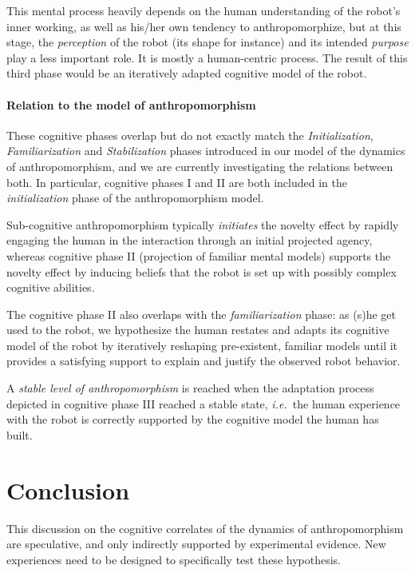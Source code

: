 \documentclass{sig-alternate-2013}
\newcommand{\ie}{{\textit{i.e.~}}}
\begin{document}
This mental process heavily depends on the human understanding of the robot's
inner working, as well as his/her own tendency to anthropomorphize, but at this
stage, the \emph{perception} of the robot (its shape for instance) and its
intended \emph{purpose} play a less important role. It is mostly a human-centric
process.  The result of this third phase would be an iteratively adapted
cognitive model of the robot.

\paragraph{Relation to the model of anthropomorphism} These cognitive phases overlap but do not exactly match the
\emph{Initialization}, \emph{Familiarization} and \emph{Stabilization} phases
introduced in our model of the dynamics of anthropomorphism, and we are
currently investigating the relations between both. In particular, cognitive
phases I and II are both included in the \emph{initialization} phase of the
anthropomorphism model.

Sub-cognitive anthropomorphism typically \emph{initiates} the novelty effect by
rapidly engaging the human in the interaction through an initial projected
agency, whereas cognitive phase II (projection of familiar mental models)
supports the novelty effect by inducing beliefs that the robot is set up with
possibly complex cognitive abilities.

The cognitive phase II also overlaps with the \emph{familiarization} phase: as
(s)he get used to the robot, we hypothesize the human restates and adapts its
cognitive model of the robot by iteratively reshaping pre-existent, familiar
models until it provides a satisfying support to explain and justify the
observed robot behavior.

A \emph{stable level of anthropomorphism} is reached when the adaptation process
depicted in cognitive phase III reached a stable state, \ie the human experience
with the robot is correctly supported by the cognitive model the human has
built.

\section{Conclusion}
\label{sec:conclusion}

This discussion on the cognitive correlates of the dynamics of anthropomorphism
are speculative, and only indirectly supported by experimental evidence. New
experiences need to be designed to specifically test these
hypothesis.
\end{document}
